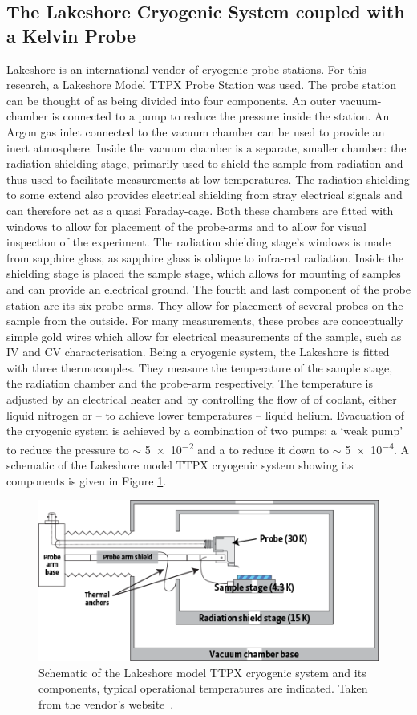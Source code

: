 \subsection{The Lakeshore Cryogenic System coupled with a \McA{} Kelvin Probe}
\label{sec:kpnew}
Lakeshore is an international vendor of cryogenic probe stations. For this research, a Lakeshore Model TTPX Probe Station was used. The probe station can be thought of as being divided into four components. An outer vacuum-chamber is connected to a pump to reduce the pressure inside the station. An Argon gas inlet connected to the vacuum chamber can be used to provide an inert atmosphere. Inside the vacuum chamber is a separate, smaller chamber: the radiation shielding stage, primarily used to shield the sample from \ir{} radiation and thus used to facilitate measurements at low temperatures. The radiation shielding to some extend also provides electrical shielding from stray electrical signals and can therefore act as a quasi Faraday-cage. Both these chambers are fitted with windows to allow for placement of the probe-arms and to allow for visual inspection of the experiment. The radiation shielding stage's windows is made from sapphire glass, as sapphire glass is oblique to infra-red radiation. Inside the shielding stage is placed the sample stage, which allows for mounting of samples and can provide an electrical ground. The fourth and last component of the probe station are its six probe-arms. They allow for placement of several probes on the sample from the outside. For many measurements, these probes are conceptually simple gold wires which allow for electrical measurements of the sample, such as IV and CV characterisation. Being a cryogenic system, the Lakeshore is fitted with three thermocouples. They measure the temperature of the sample stage, the radiation chamber and the probe-arm respectively. The temperature is adjusted by an electrical heater and by controlling the flow of of coolant, either liquid nitrogen or -- to achieve lower temperatures -- liquid helium. Evacuation of the cryogenic system is achieved by a combination of two pumps: a `weak pump' to reduce the pressure to $\sim$ \num{5e-2} and a  to reduce it down to $\sim$ \num{5e-4}. A schematic of the Lakeshore model TTPX cryogenic system showing its components is given in Figure \ref{fig:McAscheme}.\\
\begin{figure}
\centering
	\includegraphics[width=0.8\linewidth]{./figs/Config_TTPX}
	\caption{Schematic of the Lakeshore model TTPX cryogenic system and its components, typical operational temperatures are indicated. Taken from the vendor's website~\cite{lakeshore}.}
	\label{fig:McAscheme}
\end{figure}
